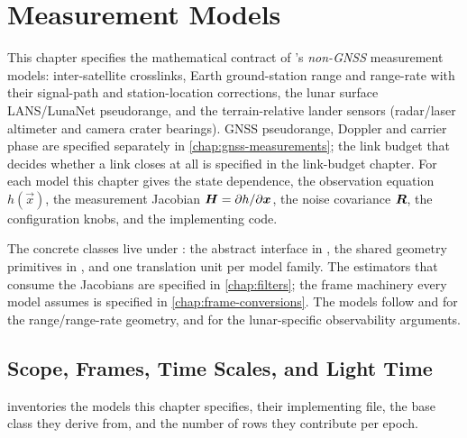 \chapter{Measurement Models}
\label{chap:measurements}

This chapter specifies the mathematical contract of \lupnt{}'s \emph{non-GNSS}
measurement models: inter-satellite crosslinks, Earth ground-station range and
range-rate with their signal-path and station-location corrections, the lunar
surface LANS/LunaNet pseudorange, and the terrain-relative lander sensors
(radar/laser altimeter and camera crater bearings). GNSS pseudorange, Doppler
and carrier phase are specified separately in \cref{chap:gnss-measurements};
the link budget that decides whether a link closes at all is specified in the
link-budget chapter. For each model this chapter gives the state dependence,
the observation equation $h(\vec{x})$, the measurement Jacobian
$\bm{H} = \partial h/\partial \bm{x}$, the noise covariance $\bm{R}$, the
configuration knobs, and the implementing code.

The concrete classes live under : the abstract
interface in , the shared geometry
primitives in , and one
translation unit per model family. The estimators that consume the Jacobians
are specified in \cref{chap:filters}; the frame machinery every model assumes
is specified in \cref{chap:frame-conversions}. The models follow
\citet{montenbruck2000} and \citet{tapley2004} for the range/range-rate
geometry, and \citep[Ch.~6]{iiyama2026thesis} for the lunar-specific
observability arguments.

\section{Scope, Frames, Time Scales, and Light Time}
\label{sec:meas-scope}

 inventories the models this chapter specifies, their
implementing file, the base class they derive from, and the number of rows
they contribute per epoch.

